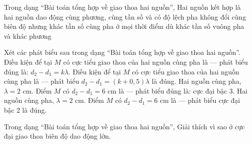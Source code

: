 \begin{ex}
Trong dạng “Bài toán tổng hợp về giao thoa hai nguồn”, Hai nguồn kết hợp là hai nguồn dao động
\choice
{\True cùng phương, cùng tần số và có độ lệch pha không đổi}
{cùng biên độ nhưng khác tần số}
{cùng pha ở mọi thời điểm dù khác tần số}
{vuông pha và khác phương}
\end{ex}

\begin{ex}
Xét các phát biểu sau trong dạng “Bài toán tổng hợp về giao thoa hai nguồn”.
\choiceTF
{\True Điều kiện để tại $M$ có cực tiểu giao thoa của hai nguồn cùng pha là — phát biểu đúng là: $d_2-d_1=k\lambda$.}
{Điều kiện để tại $M$ có cực tiểu giao thoa của hai nguồn cùng pha là — phát biểu $d_2-d_1=(k+0,5)\lambda$ là đúng.}
{\True Hai nguồn cùng pha, $\lambda=2$ cm. Điểm $M$ có $d_2-d_1=6$ cm là — phát biểu đúng là: cực đại bậc 3.}
{Hai nguồn cùng pha, $\lambda=2$ cm. Điểm $M$ có $d_2-d_1=6$ cm là — phát biểu cực đại bậc 2 là đúng.}
\end{ex}

\begin{ex}
Trong dạng “Bài toán tổng hợp về giao thoa hai nguồn”, Giải thích vì sao ở cực đại giao thoa biên độ dao động lớn.
\choiceTF

\end{ex}

